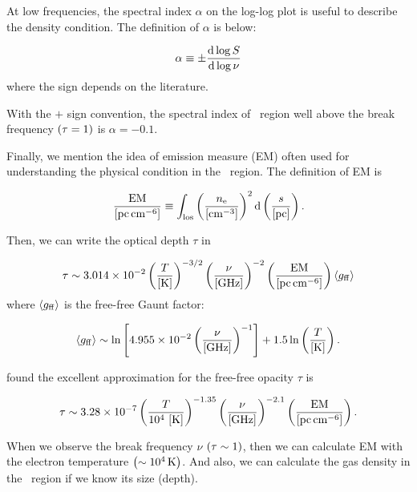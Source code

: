 At low frequencies, the spectral index $\alpha$ on the log-log plot is useful to describe the density condition.
The definition of $\alpha$ is below:

\begin{equation}\label{eq:essential_radio4n55}
    \alpha \equiv \pm \frac{\mathrm{d} \log S}{\mathrm{d} \log \nu}
\end{equation}
where the sign depends on the literature.

With the $+$ sign convention, the spectral index of \ih~region well above the break frequency $\left(\tau=1\right)$ is $\alpha=-0.1$.\\ \vspace{0.2cm}

Finally, we mention the idea of emission measure (EM) often used for understanding the physical condition in the \ih~region.
The definition of EM is

\begin{equation}\label{eq:essential_radio4n57}
    \frac{\mathrm{EM}}{\left[\mathrm{pc} \, \mathrm{cm}^{-6}\right]} \equiv \int_{\mathrm{los}}\left(\frac{n_{\mathrm{e}}}{\left[\mathrm{cm}^{-3}\right]}\right)^2 \mathrm{d}\left(\frac{s}{\left[\mathrm{pc}\right]}\right).
\end{equation}

Then, we can write the optical depth $\tau$ in

\begin{equation}\label{eq:essential_radio4n58}
    \tau \sim 3.014 \times 10^{-2}\left(\frac{T}{\left[\mathrm{K}\right]}\right)^{-3/2}\left(\frac{\nu}{\left[\mathrm{GHz}\right]}\right)^{-2}\left(\frac{\mathrm{EM}}{\left[\mathrm{pc}\,\mathrm{cm}^{-6}\right]}\right)\left\langle g_{\mathrm{ff}}\right\rangle
\end{equation}
where $\left\langle g_{\mathrm{ff}}\right\rangle$ is the free-free Gaunt factor:

\begin{equation}\label{eq:essential_radio4n59}
    \left\langle g_{\mathrm{ff}}\right\rangle \sim \ln \left[4.955 \times 10^{-2}\left(\frac{\nu}{\left[\mathrm{GHz}\right]}\right)^{-1}\right]+1.5 \ln \left(\frac{T}{\left[\mathrm{K}\right]}\right).
\end{equation}

\citet{Mezger1967} found the excellent approximation for the free-free opacity $\tau$ is

\begin{equation}\label{eq:essential_radio4n60}
    \tau \sim 3.28 \times 10^{-7}\left(\frac{T}{10^4\,\left[\mathrm{K}\right]}\right)^{-1.35}\left(\frac{\nu}{\left[\mathrm{GHz}\right]}\right)^{-2.1}\left(\frac{\mathrm{EM}}{\left[\mathrm{pc} \, \mathrm{cm}^{-6}\right]}\right).
\end{equation}

When we observe the break frequency $\nu$ $\left(\tau \sim 1\right)$, then we can calculate EM with the electron temperature $\left(\sim10^4\,\mathrm{K}\right)$.
And also, we can calculate the gas density in the \ih~region if we know its size (depth).





